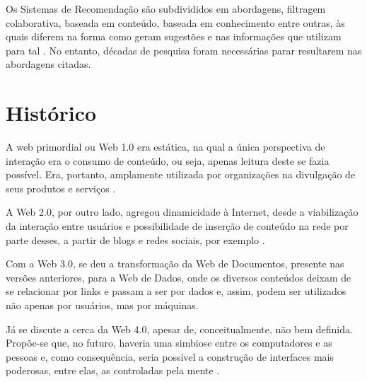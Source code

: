 Os Sistemas de Recomendação são subdivididos em abordagens, filtragem colaborativa, baseada em conteúdo, baseada em conhecimento entre outras, às quais diferem na forma como geram sugestões e nas informações que utilizam para tal \cite{Jannach2010}. No entanto, décadas de pesquisa foram necessárias parar resultarem nas abordagens citadas.

\section{Histórico}

A web primordial ou Web 1.0 era estática, na qual a única perspectiva de interação era o consumo de conteúdo, ou seja, apenas leitura deste se fazia possível. Era, portanto, amplamente utilizada por organizações na divulgação de seus produtos e serviços \cite{Aghaei2012}. 

A Web 2.0, por outro lado, agregou dinamicidade à Internet, desde a viabilização da interação entre usuários e possibilidade de inserção de conteúdo na rede por parte desses, a partir de blogs e redes sociais, por exemplo \cite{Nath2014}.

Com a Web 3.0, se deu a transformação da Web de Documentos, presente nas versões anteriores, para a Web de Dados, onde os diversos conteúdos deixam de se relacionar por links e passam a ser por dados e, assim, podem ser utilizados não apenas por usuários, mas por máquinas.
 

Já se discute a cerca da Web 4.0, apesar de, conceitualmente, não bem definida. Propõe-se que, no futuro, haveria uma simbiose entre os computadores e as pessoas e, como consequência, seria possível a construção de interfaces mais poderosas, entre elas, as controladas pela mente \cite{Aghaei2012}.

